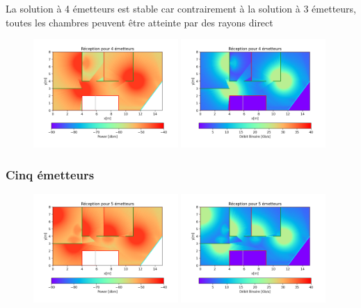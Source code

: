 \documentclass[sn-mathphys-num]{sn-jnl}%
\theoremstyle{thmstyleone}%
\theoremstyle{thmstyletwo}%
\theoremstyle{thmstylethree}%
\begin{document}
La solution à 4 émetteurs est stable car contrairement à la solution à
3 émetteurs, toutes les chambres peuvent être atteinte par des rayons direct
\begin{figure}[H]
    \centering
    \includegraphics[width=0.49\textwidth]{images/opti/4.png}
    \includegraphics[width=0.49\textwidth]{images/opti/4_bin.png}
\end{figure}

\subsubsection{Cinq émetteurs}
\label{sub-5}

\begin{figure}[H]
    \centering
    \includegraphics[width=0.49\textwidth]{images/opti/5.png}
    \includegraphics[width=0.49\textwidth]{images/opti/5_bin.png}
\end{figure}
\end{document}
